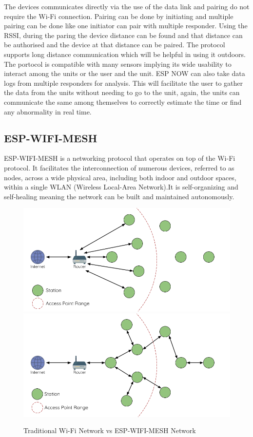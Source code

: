 The devices communicates directly via the use of the data link and pairing do not require the Wi-Fi connection. Pairing can be done by initiating and multiple pairing can be done like one initiator can pair with multiple responder. Using the RSSI, during the paring the device distance can be found and that distance can be authorised and the device at that distance can be paired. The protocol supports long distance communication which will be helpful in using it outdoors. The portocol is compatible with many sensors implying its wide usability to interact among the units or the user and the unit. ESP NOW can also take data logs from multiple responders for analysis. This will facilitate the user to gather the data from the units without needing to go to the unit, again, the units can communicate the same among themselves to correctly estimate the time or find any abnormality in real time. 


\subsection{ESP-WIFI-MESH}
ESP-WIFI-MESH is a networking protocol that operates on top of the Wi-Fi protocol. It facilitates the interconnection of numerous devices, referred to as nodes, across a wide physical area, including both indoor and outdoor spaces, within a single WLAN (Wireless Local-Area Network).It is self-organizing and self-healing meaning the network can be built and maintained autonomously.

\begin{figure}[H]
     \includegraphics[width=0.5\linewidth]{Files/Images/traditional-network.png}
     \includegraphics[width=0.55\linewidth]{Files/Images/esp-wifi-mesh.png}
     \caption{Traditional Wi-Fi Network vs ESP-WIFI-MESH Network}
     \label{fig:enter-label}

\end{figure}

